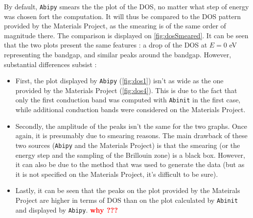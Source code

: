 \documentclass[11pt,a4paper]{article}
\begin{document}
By default, \texttt{Abipy} smears the the plot of the DOS, no matter what step of energy was chosen fort the computation. It will thus be compared to the DOS pattern provided by the Materials Project, as the smearing is of the same order of magnitude there. The comparison is displayed on \autoref{fig:dosSmeared}. It can be seen that the two plots present the same features : a drop of the DOS at $E = 0$ eV representing the bandgap, and similar peaks around the bandgap. However, substantial differences subsist : 
\begin{itemize}
\item First, the plot displayed by \texttt{Abipy} (\autoref{fig:dos1}) isn't as wide as the one provided by the Materials Project (\autoref{fig:dos4}). This is due to the fact that only the first conduction band was computed with \texttt{Abinit} in the first case, while additional conduction bands were considered on the Materials Project.
\item Secondly, the amplitude of the peaks isn't the same for the two graphs. Once again, it is presumably due to smearing reasons. The main drawback of these two sources (\texttt{Abipy} and the Materials Project) is that the smearing (or the energy step and the sampling of the Brillouin zone) is a black box. However, it can also be due to the method that was used to generate the data (but as it is not specified on the Materials Project, it's difficult to be sure).
\item Lastly, it can be seen that the peaks on the plot provided by the Mateirals Project are higher in terms of DOS than on the plot calculated by \texttt{Abinit} and displayed by \texttt{Abipy}. \textbf{\textcolor{red}{why ???}}
\end{itemize}
\end{document}
